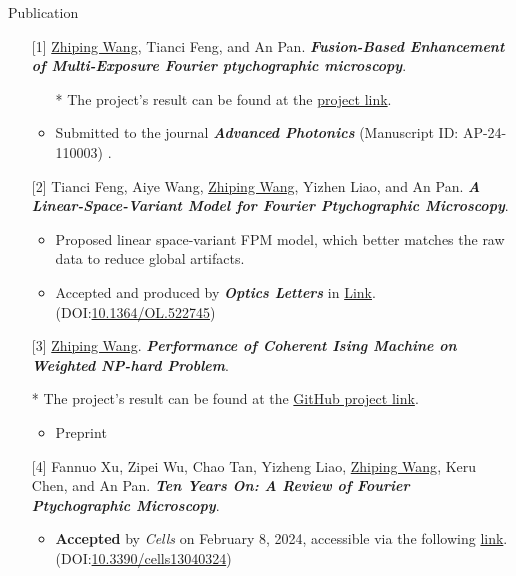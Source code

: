 \documentclass[]{kyvernitis-resume}
\begin{document}
\begin{section}{\Large Publication}
\begin{itemize}
    
    \item[{[1]}] \underline{Zhiping Wang}, Tianci Feng, and An Pan. \emph{\textbf{Fusion-Based Enhancement of Multi-Exposure Fourier ptychographic microscopy}}.
     \begin{itemize}
         \item[*] The project's result can be found at the \href{https://wang-zhiping.github.io/ResearchSummary&Reporting/FPM/fusion.html}{project link}.
    \item Submitted to the journal \emph{\textbf{Advanced Photonics}} (Manuscript ID: AP-24-110003) .
    \end{itemize}
 \item[{[2]}] Tianci Feng, Aiye Wang, \underline{Zhiping Wang}, Yizhen Liao, and An Pan. \emph{\textbf{A Linear-Space-Variant Model for Fourier Ptychographic Microscopy}}.
    \begin{itemize}
    \item Proposed linear space-variant FPM model, which better matches the raw data to reduce global artifacts.
    \item Accepted and produced by \emph{\textbf{Optics Letters}} in \href{https://opg.optica.org/ol/abstract.cfm?doi=10.1364/OL.522745}{Link}. (DOI:\href{http://dx.doi.org/10.1364/OL.522745 }{10.1364/OL.522745})


    \end{itemize}
    \item[{[3]}] \underline{Zhiping Wang}. \emph{\textbf{Performance of Coherent Ising Machine on Weighted NP-hard Problem}}.
    \item[*] The project's result can be found at the \href{https://wang-zhiping.github.io/ResearchSummary&Reporting/FPM/single-fast.html}{GitHub project link}.
    \begin{itemize}
    \item Preprint
    \end{itemize}
\item[{[4]}] Fannuo Xu, Zipei Wu, Chao Tan, Yizheng Liao, \underline{Zhiping Wang}, Keru Chen, and An Pan. \emph{\textbf{Ten Years On: A Review of Fourier Ptychographic Microscopy}}.
\begin{itemize}
\item \textbf{Accepted} by \emph{Cells} on February 8, 2024, accessible via the following \href{https://www.mdpi.com/2073-4409/13/4/324}{link}.(DOI:\href{hhttps://doi.org/10.3390/cells13040324}{10.3390/cells13040324})


    \end{itemize}
\end{itemize}
\end{section}
\end{document}
